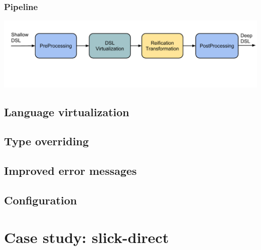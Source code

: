 \documentclass[xcolor=dvipsnames]{beamer}
\theoremstyle{definition}
\begin{document}
\begin{frame}[fragile]
    \frametitle{Pipeline}
    \begin{center}
        \includegraphics[width=\textwidth]{img/Architecture.pdf}
    \end{center}
\end{frame}


\subsection{Language virtualization} %
\label{sub:Languagevirtualization}


\subsection{Type overriding} %
\label{sub:Typeoverriding}


\subsection{Improved error messages} %
\label{sub:Improvederrormessages}


\subsection{Configuration} %
\label{sub:Directembeddingconfiguration}




\section{Case study: slick-direct} %
\label{sec:Slick-direct}
\end{document}
